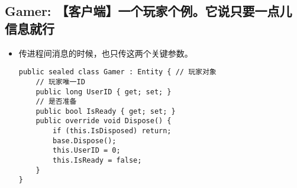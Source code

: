 \documentclass[9pt, b5paper]{article}
\begin{document}
\subsection{Gamer: 【客户端】一个玩家个例。它说只要一点儿信息就行}
\label{sec-4-4}
\begin{itemize}
\item 传进程间消息的时候，也只传这两个关键参数。
\begin{verbatim}
public sealed class Gamer : Entity { // 玩家对象
    // 玩家唯一ID
    public long UserID { get; set; }
    // 是否准备
    public bool IsReady { get; set; }
    public override void Dispose() {
        if (this.IsDisposed) return;
        base.Dispose();
        this.UserID = 0;
        this.IsReady = false;
    }
}
\end{verbatim}
\end{itemize}
\end{document}

